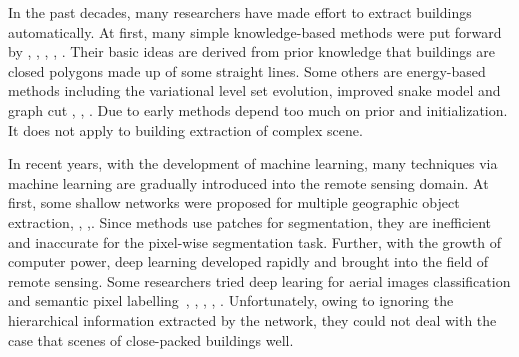 In the past decades, many researchers have made effort to extract buildings automatically.
At first, many simple knowledge-based methods were put forward by \cite{IEEEexample:huertas1988detecting}, \cite{IEEEexample:noronha2001detection}, \cite{IEEEexample:nosrati2009novel}, \cite{IEEEexample:izadi2012three}, \cite{IEEEexample:wang2015efficient}.
Their basic ideas are derived from prior knowledge that buildings are closed polygons made up of some straight lines.
Some others are energy-based methods including the variational level set evolution, improved snake model and graph cut \cite{IEEEexample:cote2013automatic}, \cite{IEEEexample:peng2005improved}, \cite{IEEEexample:sirmacek2009urban}. Due to early methods depend too much on prior and initialization. It does not apply to building extraction of complex scene.


In recent years, with the development of machine learning, many techniques via machine learning are gradually introduced into the remote sensing domain.
At first, some shallow networks were proposed for multiple geographic object extraction\cite{IEEEexample:mnih2013machine}, \cite{IEEEexample:saito2016multiple}, \cite{IEEEexample:alshehhi2017simultaneous},\cite{IEEEexample:zhao2017contextually}. Since methods use patches for segmentation, they are inefficient and inaccurate for the pixel-wise segmentation task.
Further, with the growth of computer power, deep learning developed rapidly and brought into the field of remote sensing. Some researchers tried deep learing for aerial images classification and semantic pixel labelling~\cite{IEEEexample:paisitkriangkrai2015effective}, \cite{IEEEexample:liu2017dense}, \cite{IEEEexample:audebert2017deep}, \cite{IEEEexample:kampffmeyer2017urban}, \cite{IEEEexample:he2017multi}. Unfortunately, owing to ignoring the hierarchical information extracted by the network, they could not deal with the case that scenes of close-packed buildings well.



